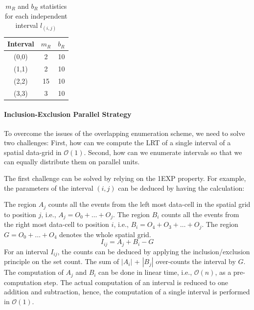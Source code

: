 \documentclass[AMA,LATO1COL]{WileyNJD-v2}
\newcommand\bigo{\mathcal O}
\begin{document}
\begin{table}[t]
\centering \caption{ $m_R$ and $b_R$ statistics for each independent interval $l_(i,j)$\label{tab:mb}}
     \begin{tabular}{|c|c|c|}
	\hline
    Interval  &  $m_R$ & $b_R$ \\
	\hline
    (0,0)  &  2 &  10 \\
    \hline
    (1,1)  & 2&  10 \\
    \hline
    (2,2)  &  15& 10 \\
    \hline
     (3,3) & 3  & 10  \\
    \hline
\end{tabular}
\label{lrt-compute}
\end{table}


\paragraph{Inclusion-Exclusion Parallel Strategy}

To overcome the issues of the overlapping enumeration scheme, we need to solve two challenges:
First, how can we compute the LRT of a single interval of a spatial data-grid in $\bigo(1)$. Second, how
can we enumerate intervals so that we can equally distribute them on parallel units.

The first challenge can be solved by relying on the 1EXP property. For example, the parameters of the interval $(i,j)$ can be deduced by having the calculation:

The region $A_j$ counts all the events from the left most data-cell in the spatial grid to position $j$, i.e., $A_j = O_0 + \ldots + O_j$. The region $B_i$ counts all the events from the right most data-cell to position $i$, i.e., $B_i = O_4 + O_3 +  \ldots + O_{j}$. The region $G = O_0 + \ldots + O_4$ denotes the whole spatial grid.
\begin{equation}
I_{ij} = A_j  + B_i - G
\end{equation}
For an interval $I_{ij}$, the counts can be deduced by applying the inclusion/exclusion principle on the set count.  The sum of $|A_i|$ + $|B_j|$ over-counts the interval by $G$. The computation of $A_j$ and $B_i$ can be done in linear time, i.e., $\bigo(n)$, as a pre-computation step. The actual computation of an interval is reduced to one addition and subtraction, hence, the computation of a single interval is performed in
$\bigo(1)$.
\end{document}
